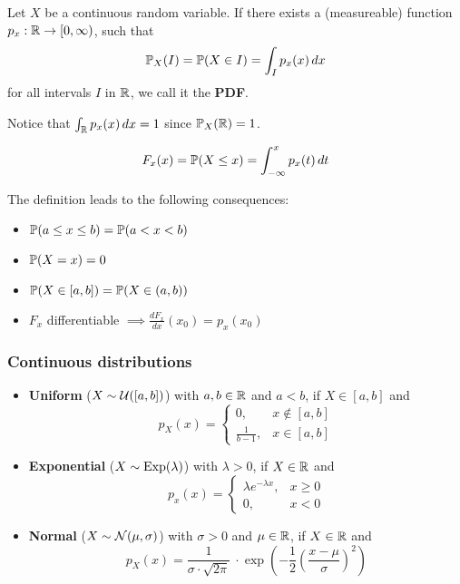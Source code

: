 \begin{cdefinition*}
  Let \(X\) be a continuous random variable. If there exists a (measureable) function \(p_x: \R \to [0, \infty)\), such that
  \[\P_X(I) = \P(X \in I) = \int_I p_x(x) \,dx\]
  for all intervals \(I\) in \(\R\), we call it the \textbf{PDF}.
\end{cdefinition*}

Notice that \(\int_\R p_x(x) \, dx = 1\) since \(\P_X(\R) = 1\).

\begin{cdefinition*}
  \[F_x(x) = \P(X \leq x) = \int_{-\infty}^x p_x(t) \,dt\]
\end{cdefinition*}
The definition leads to the following consequences:
\begin{itemize}
  \item \(\P(a \leq x \leq b) = \P(a < x < b)\)
  \item \(\P(X = x) = 0\)
  \item \(\P(X \in [a, b]) = \P(X \in (a, b))\)
  \item \(F_x\) differentiable \(\implies \frac{dF_x}{dx}(x_0) = p_x(x_0)\)
\end{itemize}

\subsubsection{Continuous distributions}
\begin{itemize}
  \item \textbf{Uniform} (\(X \sim \Unif([a, b])\)) with \(a, b \in \R\) and \(a < b\), if \(X \in [a, b]\) and
  \[p_X(x) = \begin{cases}
    0, & x \notin [a, b] \\
    \frac{1}{b - 1}, & x \in [a, b]
  \end{cases}\]

  \item \textbf{Exponential} (\(X \sim \Exp(\lambda)\)) with \(\lambda > 0\), if \(X \in \R\) and
  \[p_x(x) = \begin{cases}
    \lambda e^{-\lambda x}, & x \geq 0 \\
    0, & x < 0
  \end{cases}\]

  \item \textbf{Normal} (\(X \sim \Normal(\mu, \sigma)\)) with \(\sigma > 0\) and \(\mu \in \R\), if \(X \in \R\) and
  \[p_X(x) = \frac{1}{\sigma \cdot \sqrt{2 \pi}}\ \cdot \exp(-\frac{1}{2}\left(\frac{x - \mu}{\sigma}\right)^2)\]
\end{itemize}
